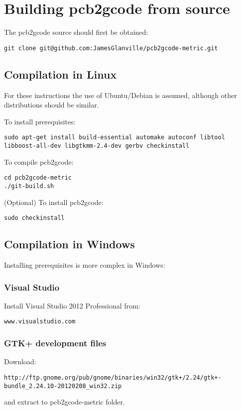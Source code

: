\documentclass[a4paper,11pt]{article}  %
\begin{document}
\newpage
\appendix
\appendixpage
\addappheadtotoc

\section{Building pcb2gcode from source}
\label{sec:buildpcb2gcode}

The pcb2gcode source should first be obtained:
\begin{lstlisting}[frame=single,breaklines=true]
git clone git@github.com:JamesGlanville/pcb2gcode-metric.git
\end{lstlisting}

\subsection{Compilation in Linux}
For these instructions the use of Ubuntu/Debian is assumed, although other distributions should be similar.

To install prerequisites:
\begin{lstlisting}[frame=single,breaklines=true]
sudo apt-get install build-essential automake autoconf libtool libboost-all-dev libgtkmm-2.4-dev gerbv checkinstall
\end{lstlisting}

To compile pcb2gcode:
\begin{lstlisting}[frame=single,breaklines=true]
cd pcb2gcode-metric
./git-build.sh
\end{lstlisting}

(Optional) To install pcb2gcode:
\begin{lstlisting}[frame=single,breaklines=true]
sudo checkinstall
\end{lstlisting}

\subsection{Compilation in Windows}
Installing prerequisites is more complex in Windows:

\subsubsection{Visual Studio}
Install Visual Studio 2012 Professional from:
\begin{lstlisting}[frame=single,breaklines=true]
www.visualstudio.com
\end{lstlisting}

\subsubsection{GTK+ development files}
Download:
\begin{lstlisting}[frame=single,breaklines=true]
http://ftp.gnome.org/pub/gnome/binaries/win32/gtk+/2.24/gtk+-bundle_2.24.10-20120208_win32.zip
\end{lstlisting}
and extract to pcb2gcode-metric folder.
\end{document}

